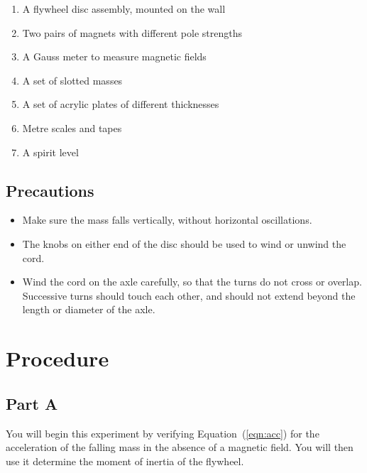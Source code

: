 \begin{enumerate}
\itemsep0em
\item A flywheel disc assembly, mounted on the wall
\item Two pairs of magnets with different pole strengths
\item A Gauss meter to measure magnetic fields
\item A set of slotted masses
\item A set of acrylic plates of different thicknesses
\item Metre scales and tapes
\item A spirit level
\end{enumerate}





\subsection*{Precautions}
\begin{itemize}
\itemsep0em
\item Make sure the mass falls vertically, without horizontal oscillations.
\item The knobs on either end of the disc should be used to wind or unwind the cord.
\item Wind the cord on the axle carefully, so that the turns do not cross or overlap. Successive turns should touch each other, and should not extend beyond the length or diameter of the axle.
\end{itemize}



\section*{Procedure}

\subsection*{Part A}

You will begin this experiment by verifying Equation~(\ref{eqn:acc}) for the acceleration of the falling mass in the absence of a magnetic field. You will then use it determine the moment of inertia of the flywheel.

